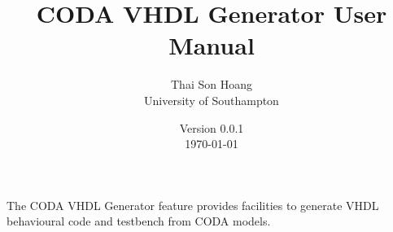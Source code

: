 \documentclass[a4paper,10pt]{article}
\title{CODA VHDL Generator User Manual}
\author{Thai Son Hoang \\ University of Southampton}
\date{%
  Version 0.0.1\\%
  \today%
}
\begin{document}
\ifplastex%
\maketitle%
\else%
 \ifstandalone%
 \maketitle %
 \else%
 \fi%
\fi%

The CODA VHDL Generator feature provides facilities to generate VHDL behavioural code and testbench from CODA models. 












\end{document}
